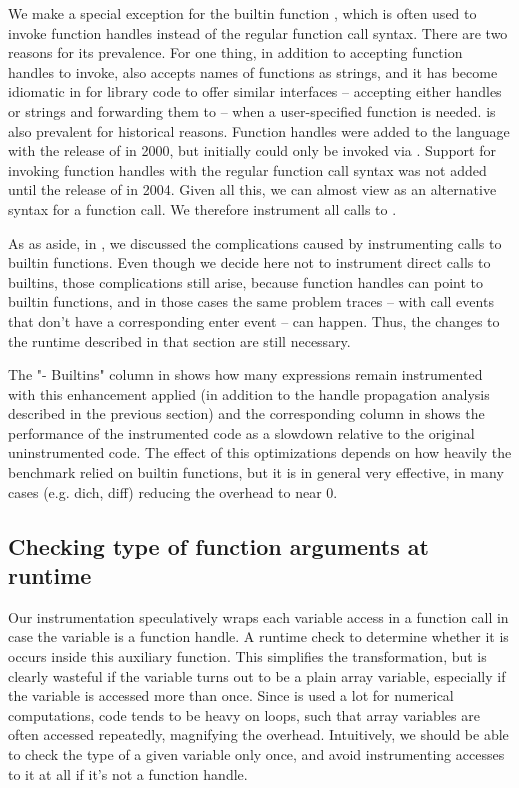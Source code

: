 We make a special exception for the builtin function , which is
often used to invoke function handles instead of the regular function call
syntax. There are two reasons for its prevalence. For one thing, in addition to
accepting function handles to invoke,  also accepts names of
functions as strings, and it has become idiomatic in \matlab for library code
to offer similar interfaces -- accepting either handles or strings and
forwarding them to  -- when a user-specified function is needed.
 is also prevalent for historical reasons. Function handles were
added to the language with the release of  in 2000, but initially
could only be invoked via . Support for invoking function handles
with the regular function call syntax was not added until the release of
 in 2004. Given all this, we can almost view  as an
alternative syntax for a function call. We therefore instrument all calls to
.

As as aside, in , we discussed the complications
caused by instrumenting calls to builtin functions. Even though we decide here
not to instrument direct calls to builtins, those complications still arise,
because function handles can point to builtin functions, and in those cases the
same problem traces -- with call events that don't have a corresponding enter
event -- can happen. Thus, the changes to the runtime described in that section
are still necessary.

The "- Builtins" column in
 shows how many
expressions remain instrumented with this enhancement applied (in addition to
the handle propagation analysis described in the previous section) and the
corresponding column in  shows the
performance of the instrumented code as a slowdown relative to the original
uninstrumented code. The effect of this optimizations depends on how heavily
the benchmark relied on builtin functions, but it is in general very effective,
in many cases (e.g. dich, diff) reducing the overhead to near 0.

\subsection{Checking type of function arguments at runtime}

Our instrumentation speculatively wraps each variable access in a function call
in case the variable is a function handle. A runtime check to determine whether
it is occurs inside this auxiliary function. This simplifies the
transformation, but is clearly wasteful if the variable turns out to be a plain
array variable, especially if the variable is accessed more than once. Since
\matlab is used a lot for numerical computations, \matlab code tends to be
heavy on loops, such that array variables are often accessed repeatedly,
magnifying the overhead. Intuitively, we should be able to check the type of a
given variable only once, and avoid instrumenting accesses to it at all if it's
not a function handle.

